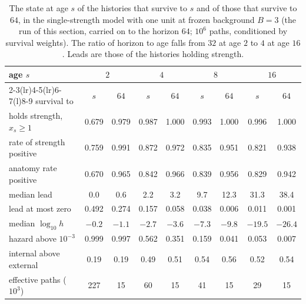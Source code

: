 \begin{table}[ht]
\centering\small
\begin{tabular}{@{}lcccccccc@{}}
\toprule
age $s$ & \multicolumn{2}{c}{$2$} & \multicolumn{2}{c}{$4$} & \multicolumn{2}{c}{$8$} & \multicolumn{2}{c}{$16$}\\
\cmidrule(lr){2-3}\cmidrule(lr){4-5}\cmidrule(lr){6-7}\cmidrule(l){8-9}
survival to & $s$ & $64$ & $s$ & $64$ & $s$ & $64$ & $s$ & $64$\\
\midrule
holds strength, $x_s\ge1$ & 0.679 & 0.979 & 0.987 & 1.000 & 0.993 & 1.000 & 0.996 & 1.000\\
rate of strength positive & 0.759 & 0.991 & 0.872 & 0.972 & 0.835 & 0.951 & 0.821 & 0.938\\
anatomy rate positive & 0.670 & 0.965 & 0.842 & 0.966 & 0.839 & 0.956 & 0.829 & 0.942\\
median lead & 0.0 & 0.6 & 2.2 & 3.2 & 9.7 & 12.3 & 31.3 & 38.4\\
lead at most zero & 0.492 & 0.274 & 0.157 & 0.058 & 0.038 & 0.006 & 0.011 & 0.001\\
median $\log_{10}h$ & $-0.2$ & $-1.1$ & $-2.7$ & $-3.6$ & $-7.3$ & $-9.8$ & $-19.5$ & $-26.4$\\
hazard above $10^{-3}$ & 0.999 & 0.997 & 0.562 & 0.351 & 0.159 & 0.041 & 0.053 & 0.007\\
internal above external & 0.19 & 0.19 & 0.49 & 0.51 & 0.54 & 0.56 & 0.52 & 0.54\\
effective paths ($10^3$) & 227 & 15 & 60 & 15 & 41 & 15 & 29 & 15\\
\bottomrule
\end{tabular}
\caption{\small The state at age $s$ of the histories that survive to
$s$ and of those that survive to $64$, in the single-strength model with
one unit at frozen background $B=3$ (the run of this section, carried on to
the horizon $64$; $10^6$ paths, conditioned by survival weights). The
ratio of horizon to age falls from $32$ at age $2$ to $4$ at age $16$.
Leads are those of the histories holding strength.}
\label{tab:forward}
\end{table}

